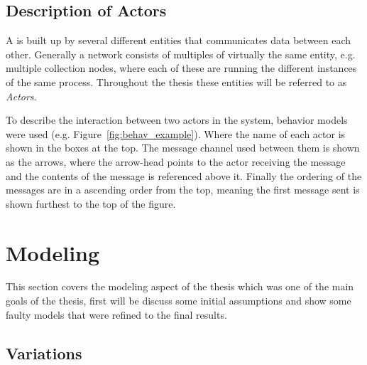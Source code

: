 

\subsection{Description of Actors}

A \wsn is built up by several different entities that communicates data between each other. Generally a network consists of multiples of virtually the same entity, e.g. multiple collection nodes, where each of these are running the different instances of the same process. Throughout the thesis these entities will be referred to as \textit{Actors}.

To describe the interaction between two actors in the system, behavior models were used (e.g. Figure~\ref{fig:behav_example}). Where the name of each actor is shown in the boxes at the top. The message channel used between them is shown as the arrows, where the arrow-head points to the actor receiving the message and the contents of the message is referenced above it. Finally the ordering of the messages are in a ascending order from the top, meaning the first message sent is shown furthest to the top of the figure.

\section{Modeling}

This section covers the modeling aspect of the thesis which was one of the main goals of the thesis, first will be discuss some initial assumptions and show some faulty models that were refined to the final results. 



\subsection{Variations}

